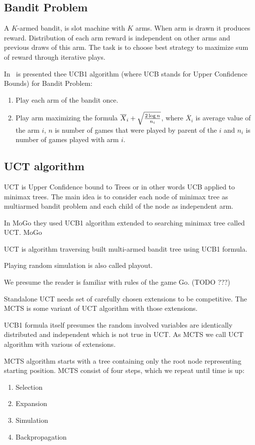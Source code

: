 \subsection{Bandit Problem}
A $K$-armed bandit, is slot machine with $K$ arms. When arm is drawn it
produces reward. Distribution of each arm reward is independent on other arms
and previous draws of this arm. The task is to choose best strategy to maximize
sum of reward through iterative plays.~\cite{MoGo,MultiarmedBandit}

In~\cite{MultiarmedBandit} is presented thee UCB1 algorithm (where UCB stands for Upper Confidence Bounds) for Bandit Problem:

\begin{enumerate}
\item Play each arm of the bandit once.
\item Play arm maximizing the formula $\overline X_i + \sqrt{2 \log n \over n_i}$,
	  where $\overline X_i$ is average value of the arm $i$, $n$ is number
	  of games that were played by parent of the $i$ and $n_i$ is number of
	  games played with arm $i$.
\end{enumerate}


\subsection{UCT algorithm}
UCT is Upper Confidence bound to Trees or in other words UCB applied to minimax
trees. The main idea is to consider each node of minimax tree as multiarmed
bandit problem and each child of the node as independent arm.

In MoGo they used UCB1 algorithm extended to searching minimax tree called UCT.
MoGo \cite{MoGo}

UCT is algorithm traversing built multi-armed bandit tree using UCB1 formula.

Playing random simulation is also called playout.

We presume the reader is familiar with rules of the game Go. (TODO ???)
	
Standalone UCT needs set of carefully chosen extensions to be competitive. The
MCTS is some variant of UCT algorithm with those extensions.

UCB1 formula itself presumes the random involved variables are identically distributed and independent which is not true in UCT.
As MCTS we call UCT algorithm with various of extensions.

MCTS algorithm starts with a tree containing only the root node representing starting position.
MCTS consist of four steps, which we repeat until time is up:
\begin{enumerate}
\item Selection
\item Expansion
\item Simulation
\item Backpropagation
\end{enumerate}
\cite{progressive-strategies}

